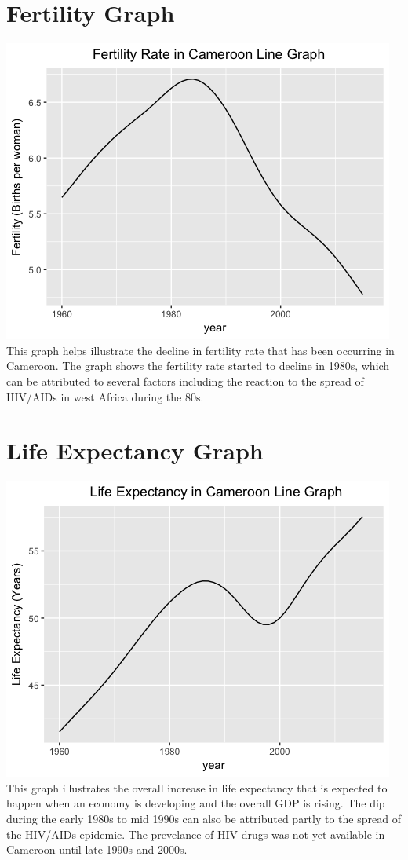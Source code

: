 \documentclass{article}
\begin{document}
\section{Fertility Graph}
\includegraphics[height = 6cm width = 7cm]{RplotCamFertility}
{This graph helps illustrate the decline in fertility rate that has been occurring in Cameroon. The graph shows the fertility rate started to decline in 1980s, which can be attributed to several factors including the reaction to the spread of HIV/AIDs in west Africa during the 80s.}

\section{Life Expectancy Graph}
\includegraphics[height = 6cm width = 7cm]{RplotCamLifeExpect}
{This graph illustrates the overall increase in life expectancy that is expected to happen when an economy is developing and the overall GDP is rising. The dip during the early 1980s to mid 1990s can also be attributed partly to the spread of the HIV/AIDs epidemic. The prevelance of HIV drugs was not yet available in Cameroon until late 1990s and 2000s.}
\end{document}
